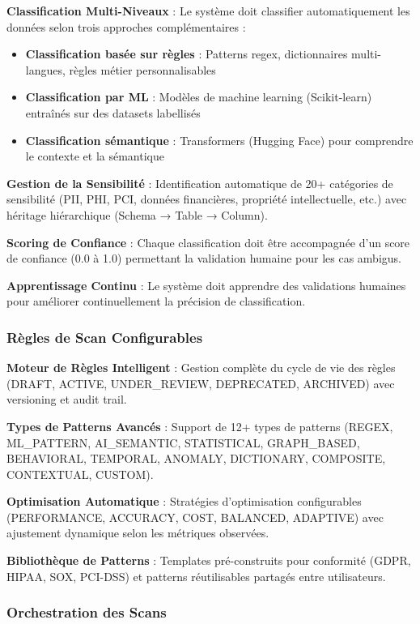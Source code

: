 \textbf{Classification Multi-Niveaux} : Le système doit classifier automatiquement les données selon trois approches complémentaires :
\begin{itemize}
    \item \textbf{Classification basée sur règles} : Patterns regex, dictionnaires multi-langues, règles métier personnalisables
    \item \textbf{Classification par ML} : Modèles de machine learning (Scikit-learn) entraînés sur des datasets labellisés
    \item \textbf{Classification sémantique} : Transformers (Hugging Face) pour comprendre le contexte et la sémantique
\end{itemize}

\textbf{Gestion de la Sensibilité} : Identification automatique de 20+ catégories de sensibilité (PII, PHI, PCI, données financières, propriété intellectuelle, etc.) avec héritage hiérarchique (Schema → Table → Column).

\textbf{Scoring de Confiance} : Chaque classification doit être accompagnée d'un score de confiance (0.0 à 1.0) permettant la validation humaine pour les cas ambigus.

\textbf{Apprentissage Continu} : Le système doit apprendre des validations humaines pour améliorer continuellement la précision de classification.

\subsubsection{Règles de Scan Configurables}

\textbf{Moteur de Règles Intelligent} : Gestion complète du cycle de vie des règles (DRAFT, ACTIVE, UNDER\_REVIEW, DEPRECATED, ARCHIVED) avec versioning et audit trail.

\textbf{Types de Patterns Avancés} : Support de 12+ types de patterns (REGEX, ML\_PATTERN, AI\_SEMANTIC, STATISTICAL, GRAPH\_BASED, BEHAVIORAL, TEMPORAL, ANOMALY, DICTIONARY, COMPOSITE, CONTEXTUAL, CUSTOM).

\textbf{Optimisation Automatique} : Stratégies d'optimisation configurables (PERFORMANCE, ACCURACY, COST, BALANCED, ADAPTIVE) avec ajustement dynamique selon les métriques observées.

\textbf{Bibliothèque de Patterns} : Templates pré-construits pour conformité (GDPR, HIPAA, SOX, PCI-DSS) et patterns réutilisables partagés entre utilisateurs.

\subsubsection{Orchestration des Scans}

